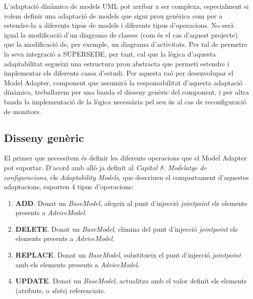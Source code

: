 L'adaptació dinàmica de models UML pot arribar a ser complexa, especialment si volem definir una adaptació de models que sigui prou genèrica com per a estendre-la a diferents tipus de models i diferents tipus d'operacions. No serà igual la modificació d'un diagrama de classes (com és el cas d'aquest projecte) que la modificació de, per exemple, un diagrama d'activitats. Per tal de permetre la seva integració a SUPERSEDE, per tant, cal que la lògica d'aquesta adaptabilitat segueixi una estructura prou abstracta que permeti estendre i implementar els diferents casos d'estudi. Per aquesta raó per desenvolupar el Model Adapter, component que assumirà la responsabilitat d'aquesta adaptació dinàmica, treballarem per una banda el disseny genèric del component, i per altra banda la implementació de la lògica necessària pel seu ús al cas de reconfiguració de monitors.\\

\subsection{Disseny genèric}

El primer que necessitem és definir les diferents operacions que el Model Adapter pot suportar. D'acord amb allò ja definit al \textit{Capítol 8. Modelatge de configuracions}, els \textit{Adaptability Models}, que descriuen el comportament d'aquestes adaptacions, suporten 4 tipus d'operacions: 

\begin{enumerate}
\item \textbf{ADD}. Donat un \textit{BaseModel}, afegeix al punt d'injecció \textit{jointpoint} els elements presents a \textit{AdviceModel}.
\item \textbf{DELETE}. Donat un \textit{BaseModel}, elimina del punt d'injecció \textit{jointpoint} els elements presents a \textit{AdviceModel}.
\item \textbf{REPLACE}. Donat un \textit{BaseModel}, substitueix el punt d'injecció \textit{jointpoint} amb els elements presents a \textit{AdviceModel}.
\item \textbf{UPDATE}. Donat un \textit{BaseModel}, actualitza amb el valor definit els elements (atributs, o \textit{slots}) referenciats.
\end{enumerate}

